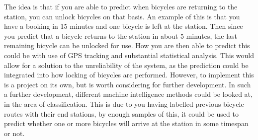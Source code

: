 \begin{description}[style=nextline]
		\item[Prediction]
		The idea is that if you are able to predict when bicycles are returning to the station, you can unlock bicycles on that basis.
		An example of this is that you have a booking in 15 minutes and one bicycle is left at the station. Then since you predict that a bicycle returns to the station in about 5 minutes, the last remaining bicycle can be unlocked for use.
		How you are then able to predict this could be with use of GPS tracking and substantial statistical analysis.
		This would allow for a solution to the unreliability of the system, as the prediction could be integrated into how locking of bicycles are performed.
		However, to implement this is a project on its own, but is worth considering for further development.
		In such a further development, different machine intelligence methods could be looked at, in the area of classification.
		This is due to you having labelled previous bicycle routes with their end stations, by enough samples of this, it could be used to predict whether one or more bicycles will arrive at the station in some timespan or not.
\end{description}

